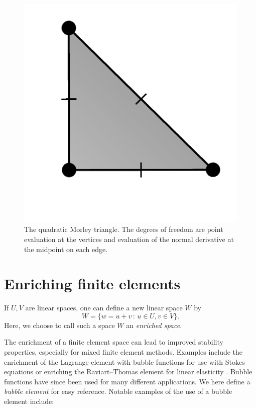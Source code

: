 \begin{figure}
  \centering
  \includegraphics[width=\smallfig]{chapters/kirby-6/png/MOR_2d.png}
  \caption{The quadratic Morley triangle. The degrees of freedom are
    point evaluation at the vertices and evaluation of the normal
      derivative at the midpoint on each edge.}
\end{figure}

\section{Enriching finite elements}

If $U, V$ are linear spaces, one can define a new linear space $W$ by
\begin{equation}
  W = \{ w = u + v \, : \, u \in U, v \in V \}.
\end{equation}
Here, we choose to call such a space $W$ an \emph{enriched space}.

The enrichment of a finite element space can lead to improved
stability properties, especially for mixed finite element
methods. Examples include the enrichment of the Lagrange element with
bubble functions for use with Stokes equations or enriching the
Raviart--Thomas element for linear elasticity
\citep{ArnoldBrezziDouglas1984, ArnoldBrezziFortin1984}. Bubble
functions have since been used for many different applications. We
here define a \emph{bubble element} for easy reference. Notable
examples of the use of a bubble element include:
